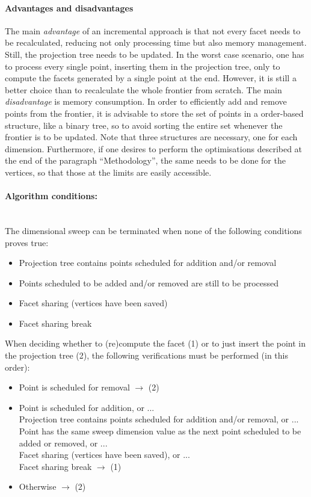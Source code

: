 \paragraph{Advantages and disadvantages} The main \textit{advantage} of an incremental approach is that not every facet needs to be recalculated, reducing not only processing time but also memory management. Still, the projection tree needs to be updated. In the worst case scenario, one has to process every single point, inserting them in the projection tree, only to compute the facets generated by a single point at the end. However, it is still a better choice than to recalculate the whole frontier from scratch. The main \textit{disadvantage} is memory consumption. In order to efficiently add and remove points from the frontier, it is advisable to store the set of points in a order-based structure, like a binary tree, so to avoid sorting the entire set whenever the frontier is to be updated. Note that three structures are necessary, one for each dimension. Furthermore, if one desires to perform the optimisations described at the end of the paragraph ``Methodology'', the same needs to be done for the vertices, so that those at the limits are easily accessible.

\paragraph{Algorithm conditions:}\ \\[2pt]The dimensional sweep can be terminated when none of the following conditions proves true:
\begin{itemize}
\item Projection tree contains points scheduled for addition and/or removal
\item Points scheduled to be added and/or removed are still to be processed
\item Facet sharing (vertices have been saved)
\item Facet sharing break
\end{itemize}
When deciding whether to (re)compute the facet (1) or to just insert the point in the projection tree (2), the following verifications must be performed (in this order):
\begin{itemize}
\item Point is scheduled for removal $\rightarrow$ (2)
\item Point is scheduled for addition, or ...
\\[2pt] Projection tree contains points scheduled for addition and/or removal, or ...
\\[2pt] Point has the same sweep dimension value as the next point scheduled to be added or removed, or ...
\\[2pt] Facet sharing (vertices have been saved), or ...
\\[2pt] Facet sharing break $\rightarrow$ (1)
\item Otherwise $\rightarrow$ (2)
\end{itemize}

